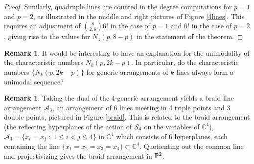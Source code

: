 \documentclass[12pt]{article}
\theoremstyle{plain}
\theoremstyle{definition}
\newtheorem{remark}[theorem]{Remark}
\newcommand{\A}{\mathcal{A}}
\newcommand{\C}{\mathbb{C}}
\renewcommand{\P}{\ensuremath \mathbb{P}}
\renewcommand{\S}{\ensuremath \mathcal{S}}
\begin{document}
\begin{proof}
Similarly, quadruple lines are counted in the degree
computations for $p=1$ and $p=2$, as illustrated in the middle and
right pictures of Figure \ref{4lines}. This requires an adjustment of
$\binom{8}{2,6}6!$ in the case of $p=1$ and $6!$ in the case of
$p=2$, giving rise to the values for $N_4(p,8-p)$ in the statement of the theorem. 
\end{proof} 

\begin{remark} It would be interesting to have an explanation for the unimodality of
the characteristic numbers $N_k(p,2k-p)$. In
particular, do the characteristic numbers
$\{ N_k(p,2k-p)\}$ for generic arrangements of $k$ lines always form a unimodal sequence? 
\end{remark}

\begin{remark} \label{braidr}
Taking the dual of the $4$-generic arrangement yields a braid line
arrangement $\mathcal{A}_3$, an arrangement of $6$ lines meeting in 4 triple points
and 3 double points, pictured in Figure \ref{braid}. This is related
to the braid arrangement (the reflecting hyperplanes of the
action of $\S_4$ on the variables of $\C^4$), $\A_3 = \{x_i = x_j \; : \; 1 \leq i
< j \leq 4\}$ in $\C^4$ which consists of 6 hyperplanes, each
containing the line $\{x_1=x_2=x_3=x_4\} \subset \C^4$. Quotienting
out the common line and projectivizing gives the braid arrangement in $\P^2$. 



\end{remark}
\end{document}
